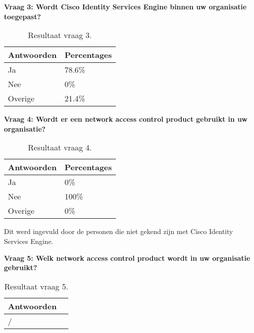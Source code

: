 \textbf{Vraag 3: Wordt Cisco Identity Services Engine binnen uw organisatie toegepast?}

\begin{table}[h!]
	\begin{center}
		\begin{tabular}{|l|l|}
			\hline
		\bf Antwoorden    & \bf Percentages \\ \hline
		Ja      & 78.6\% \\ \hline
		Nee     & 0\%    \\ \hline
		Overige & 21.4\% \\ \hline
		\end{tabular}
		\caption{Resultaat vraag 3.}
	\end{center}
\end{table}

\textbf{Vraag 4: Wordt er een network access control product gebruikt in uw organisatie? }

\begin{table}[h!]
	\begin{center}
		\begin{tabular}{|l|l|}
			\hline
			\bf Antwoorden    & \bf Percentages \\ \hline
			Ja      & 0\%   \\ \hline
			Nee     & 100\% \\ \hline
			Overige & 0\%   \\ \hline
		\end{tabular}
		\caption{Resultaat vraag 4.}
	\end{center}
\end{table}

Dit werd ingevuld door de personen die niet gekend zijn met Cisco Identity Services Engine.

\newline
\textbf{Vraag 5: Welk network access control product wordt in uw organisatie gebruikt?}

\begin{table}[h!]
	\begin{center}
		\begin{tabular}{|l|l|}
			\hline
			\bf Antwoorden \\ \hline
			/ \\ \hline
		\end{tabular}
		\caption{Resultaat vraag 5.}
	\end{center}
\end{table}

